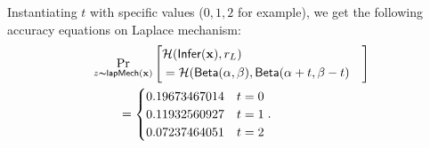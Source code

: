 \documentclass{article}
\begin{document}
Instantiating $t$ with specific values ($0,1,2$ for example), we get the following accuracy equations on Laplace mechanism:
\begin{align*}
&\lapmechPr{\dataobs}{
\begin{aligned}
\lefteqn{\hellinger(\bysinfer(\dataobs), r_L )}\\ 
&= \hellinger(\betad(\alpha, \beta), \betad(\alpha + t, \beta - t)
\end{aligned}
}\\
& \qquad = \begin{cases}
0.19673467014 & t = 0\\
0.11932560927 & t = 1\\
0.07237464051 & t = 2
\end{cases}.
\end{align*}
\end{document}
